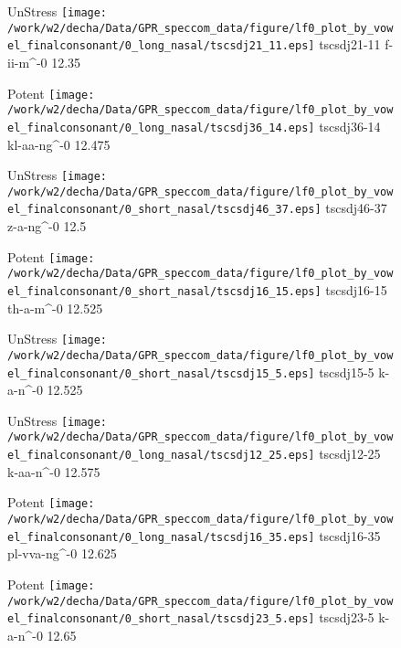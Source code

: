 \documentclass{article}
\begin{document}
\begin{figure}[t]
\begin{minipage}[b]{.24\textwidth}
UnStress
\centering
\texttt{[image: /work/w2/decha/Data/GPR\_speccom\_data/figure/lf0\_plot\_by\_vowel\_finalconsonant/0\_long\_nasal/tscsdj21\_11.eps]}
tscsdj21-11 f-ii-m\textasciicircum-0 12.35
\end{minipage}
\begin{minipage}[b]{.24\textwidth}
\colorbox{Apricot}{Potent}
\centering
\texttt{[image: /work/w2/decha/Data/GPR\_speccom\_data/figure/lf0\_plot\_by\_vowel\_finalconsonant/0\_long\_nasal/tscsdj36\_14.eps]}
tscsdj36-14 kl-aa-ng\textasciicircum-0 12.475
\end{minipage}
\begin{minipage}[b]{.24\textwidth}
UnStress
\centering
\texttt{[image: /work/w2/decha/Data/GPR\_speccom\_data/figure/lf0\_plot\_by\_vowel\_finalconsonant/0\_short\_nasal/tscsdj46\_37.eps]}
tscsdj46-37 z-a-ng\textasciicircum-0 12.5
\end{minipage}
\begin{minipage}[b]{.24\textwidth}
\colorbox{Apricot}{Potent}
\centering
\texttt{[image: /work/w2/decha/Data/GPR\_speccom\_data/figure/lf0\_plot\_by\_vowel\_finalconsonant/0\_short\_nasal/tscsdj16\_15.eps]}
tscsdj16-15 th-a-m\textasciicircum-0 12.525
\end{minipage}
\end{figure}

\begin{figure}[t]
\begin{minipage}[b]{.24\textwidth}
UnStress
\centering
\texttt{[image: /work/w2/decha/Data/GPR\_speccom\_data/figure/lf0\_plot\_by\_vowel\_finalconsonant/0\_short\_nasal/tscsdj15\_5.eps]}
tscsdj15-5 k-a-n\textasciicircum-0 12.525
\end{minipage}
\begin{minipage}[b]{.24\textwidth}
UnStress
\centering
\texttt{[image: /work/w2/decha/Data/GPR\_speccom\_data/figure/lf0\_plot\_by\_vowel\_finalconsonant/0\_long\_nasal/tscsdj12\_25.eps]}
tscsdj12-25 k-aa-n\textasciicircum-0 12.575
\end{minipage}
\begin{minipage}[b]{.24\textwidth}
\colorbox{Apricot}{Potent}
\centering
\texttt{[image: /work/w2/decha/Data/GPR\_speccom\_data/figure/lf0\_plot\_by\_vowel\_finalconsonant/0\_long\_nasal/tscsdj16\_35.eps]}
tscsdj16-35 pl-vva-ng\textasciicircum-0 12.625
\end{minipage}
\begin{minipage}[b]{.24\textwidth}
\colorbox{Apricot}{Potent}
\centering
\texttt{[image: /work/w2/decha/Data/GPR\_speccom\_data/figure/lf0\_plot\_by\_vowel\_finalconsonant/0\_short\_nasal/tscsdj23\_5.eps]}
tscsdj23-5 k-a-n\textasciicircum-0 12.65
\end{minipage}
\end{figure}
\end{document}
